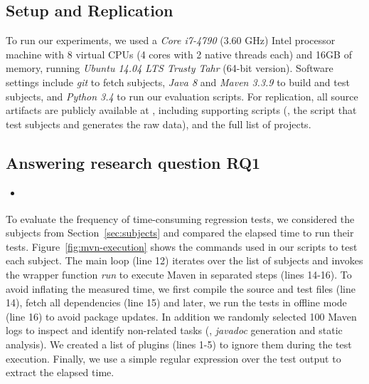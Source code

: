 \subsection{Setup and Replication}
\label{sec:setup}

To run our experiments, we used a \emph{Core i7-4790} (3.60 GHz) Intel
processor machine with 8 virtual CPUs (4 cores with 2 native threads
each) and 16GB of memory, running \emph{Ubuntu 14.04 LTS Trusty Tahr}
(64-bit version). Software settings include \emph{git} to fetch
subjects, \emph{Java 8} and \emph{Maven 3.3.9} to build and test subjects,
and \emph{Python 3.4} to run our evaluation scripts. For replication,
all source artifacts are publicly available at ,
including supporting scripts (\eg, the script that test subjects and
generates the raw data), and the full list of projects. 

\subsection{Answering research question RQ1}
\label{sec:rqone}

\begin{itemize}
    \item \emph{\RQA}
\end{itemize}

To evaluate the frequency of time-consuming regression tests, we
considered the \SubjCnt{} subjects from Section~\ref{sec:subjects} and
compared the elapsed time to run their tests.
Figure~\ref{fig:mvn-execution} shows the commands used in our scripts
to test each subject. The main loop (line 12) iterates over the list
of subjects and invokes the wrapper function \emph{run} to execute
Maven in separated steps (lines 14-16). To avoid inflating the
measured time, we first compile the source and test files (line 14),
fetch all dependencies (line 15) and later, we run the tests in offline
mode (line 16) to avoid package updates. In addition we randomly
selected 100 Maven logs to inspect and identify non-related tasks
(\eg, \emph{javadoc} generation and static analysis). We created a
list of plugins (lines 1-5) to ignore them during the test execution.
Finally, we use a simple regular expression over the test output to
extract the elapsed time.

